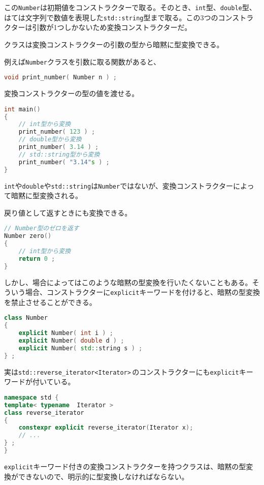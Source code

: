この\texttt{Number}は初期値をコンストラクターで取る。そのとき、\texttt{int}型、\texttt{double}型、はては文字列で数値を表現した\texttt{std::string}型まで取る。この3つのコンストラクターは引数が1つしかないため変換コンストラクターだ。

クラスは変換コンストラクターの引数の型から暗黙に型変換できる。

例えば\texttt{Number}クラスを引数に取る関数があると、
\begin{lstlisting}[language={C++}]
void print_number( Number n ) ;
\end{lstlisting}
変換コンストラクターの型の値を渡せる。

\begin{lstlisting}[language={C++}]
int main()
{
    // int型から変換
    print_number( 123 ) ;
    // double型から変換
    print_number( 3.14 ) ;
    // std::string型から変換
    print_number( "3.14"s ) ;
}
\end{lstlisting}

\texttt{int}や\texttt{double}や\texttt{std::string}は\texttt{Number}ではないが、変換コンストラクターによって暗黙に型変換される。

戻り値として返すときにも変換できる。

\begin{lstlisting}[language={C++}]
// Number型のゼロを返す
Number zero()
{
    // int型から変換
    return 0 ;
}
\end{lstlisting}

しかし、場合によってはこのような暗黙の型変換を行いたくないこともある。そういう場合、コンストラクターに\texttt{explicit}キーワードを付けると、暗黙の型変換を禁止させることができる。

\begin{lstlisting}[language={C++}]
class Number
{
    explicit Number( int i ) ;
    explicit Number( double d ) ;
    explicit Number( std::string s ) ;
} ;
\end{lstlisting}

実は\texttt{std::reverse\_iterator<Iterator>}\,のコンストラクターにも\texttt{explicit}キーワードが付いている。

\begin{lstlisting}[language={C++}]
namespace std {
template< typename  Iterator >
class reverse_iterator
{
    constexpr explicit reverse_iterator(Iterator x);
    // ...
} ;
}
\end{lstlisting}

\texttt{explicit}キーワード付きの変換コンストラクターを持つクラスは、暗黙の型変換ができないので、明示的に型変換しなければならない。

